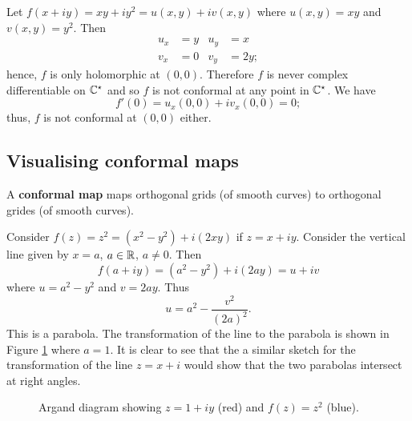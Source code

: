 
\begin{example}
    Let $f(x + iy) = xy + iy^2 = u(x, y) + iv(x, y)$ where $u(x, y) = xy$ and $v(x, y) = y^2$. Then
    \begin{align*}
        u_x &= y & u_y &= x \\
        v_x &= 0 & v_y &= 2y;
    \end{align*}
    hence, $f$ is only holomorphic at $(0, 0)$. Therefore $f$ is never complex differentiable on $\mathbb{C}^\star$ and so $f$ is not conformal at any point in $\mathbb{C}^\star$. We have
    \[ f'(0) = u_x(0,0) + iv_x(0,0) = 0; \]
    thus, $f$ is not conformal at $(0,0)$ either. 
\end{example}

\subsection*{Visualising conformal maps}

\begin{corollary}
    A \textbf{conformal map} maps orthogonal grids (of smooth curves) to orthogonal grides (of smooth curves).
\end{corollary}

\begin{example}
    Consider $f(z) = z^2 = (x^2 - y^2) + i(2xy)$ if $z = x + iy$. Consider the vertical line given by $x = a$, $a \in \mathbb{R}$, $a \neq 0$. Then \[ f(a + iy) = (a^2 - y^2) + i(2ay) = u + iv \]
    where $u = a^2 - y^2$ and $v = 2ay$. Thus
    \[ u = a^2 - \frac{v^2}{(2a)^2}. \]
    This is a parabola. The transformation of the line to the parabola is shown in Figure \ref{fig:conformal-map-ex-1} where $a = 1$. It is clear to see that the a similar sketch for the transformation of the line $z = x + i$ would show that the two parabolas intersect at right angles. 
\end{example}

\begin{figure}
    \centering
    \caption{Argand diagram showing $z = 1 + iy$ (red) and $f(z) = z^2$ (blue).}
    \label{fig:conformal-map-ex-1}
\end{figure}

